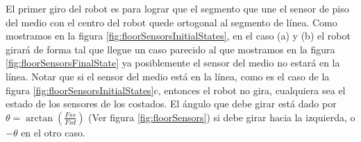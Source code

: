El primer giro del robot es para lograr que el segmento que une el sensor de
piso del medio con el centro del robot quede ortogonal al segmento de l\'inea.
Como mostramos en la figura \ref{fig:floorSensorsInitialStates}, en el caso
(a) y (b) el robot girar\'a de forma tal que llegue un caso parecido al que
mostramos en la figura \ref{fig:floorSensorsFinalState} ya posiblemente el
sensor del medio no estar\'a en la l\'inea. Notar que si el sensor del medio
est\'a en la l\'inea, como es el caso de la figura
\ref{fig:floorSensorsInitialStates}c,
entonces el robot no gira, cualquiera sea el estado de los sensores de los
costados. El \'angulo que debe girar est\'a dado por $\theta = \arctan
(\frac{Fss}{Fsd})$ (Ver figura \ref{fig:floorSensors}) si debe girar hacia
la izquierda, o $-\theta$ en el otro caso.

